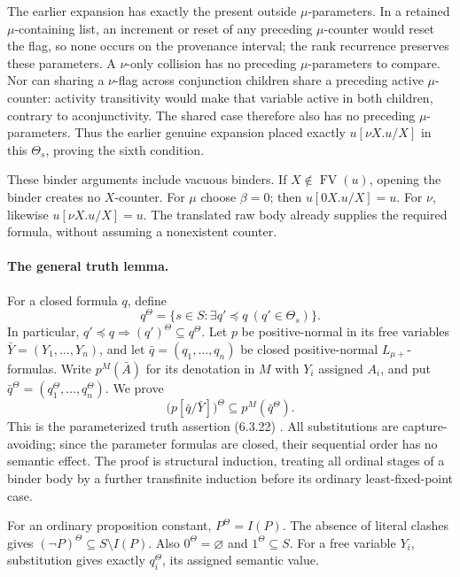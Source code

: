 The earlier expansion has exactly the present
outside \(\mu\)-parameters. In a retained
\(\mu\)-containing list, an increment or reset
of any preceding \(\mu\)-counter would reset
the flag, so none occurs on the provenance interval;
the rank recurrence preserves these parameters.
A \(\nu\)-only collision has no preceding
\(\mu\)-parameters to compare. Nor can sharing
a \(\nu\)-flag across conjunction children
share a preceding active \(\mu\)-counter:
activity transitivity would make that variable
active in both children, contrary to aconjunctivity.
The shared case therefore also has no preceding
\(\mu\)-parameters. Thus the earlier genuine
expansion placed exactly \(u[\nu X.u/X]\) in
this \(\Theta_s\), proving the sixth condition.

These binder arguments include vacuous binders.
If \(X\notin\operatorname{FV}(u)\), opening the
binder creates no \(X\)-counter. For \(\mu\)
choose \(\beta=0\); then
\(u[0X.u/X]=u\). For \(\nu\), likewise
\(u[\nu X.u/X]=u\). The translated raw body
already supplies the required formula, without
assuming a nonexistent counter.

\paragraph{The general truth lemma.}
For a closed formula \(q\), define
\[
 q^\Theta=\{s\in S:
           \exists q'\preceq q\ (q'\in\Theta_s)\}.
\]
In particular,
\(q'\preceq q\Longrightarrow(q')^\Theta\subseteq q^\Theta\).
Let \(p\) be positive-normal in its free variables
\(\bar Y=(Y_1,\ldots,Y_n)\), and let
\(\bar q=(q_1,\ldots,q_n)\) be closed positive-normal
\(L_{\mu+}\)-formulas. Write \(p^M(\bar A)\)
for its denotation in \(M\) with \(Y_i\) assigned
\(A_i\), and put
\(\bar q^\Theta=(q_1^\Theta,\ldots,q_n^\Theta)\).
We prove
\[
 \bigl(p[\bar q/\bar Y]\bigr)^\Theta
       \subseteq p^M(\bar q^\Theta).
\]
This is the parameterized truth assertion (6.3.22)
\cite[pp.~351--353]{Kozen1983}. All substitutions
are capture-avoiding; since the parameter formulas
are closed, their sequential order has no semantic
effect. The proof is structural induction, treating
all ordinal stages of a binder body by a further
transfinite induction before its ordinary
least-fixed-point case.

For an ordinary proposition constant,
\(P^\Theta=I(P)\). The absence of literal clashes
gives \((\neg P)^\Theta\subseteq S\setminus I(P)\).
Also \(0^\Theta=\varnothing\) and
\(1^\Theta\subseteq S\). For a free variable
\(Y_i\), substitution gives exactly
\(q_i^\Theta\), its assigned semantic value.

